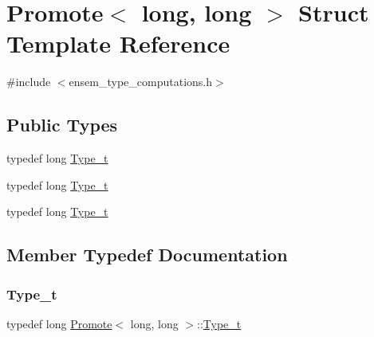 \hypertarget{structPromote_3_01long_00_01long_01_4}{}\section{Promote$<$ long, long $>$ Struct Template Reference}
\label{structPromote_3_01long_00_01long_01_4}


{\ttfamily \#include $<$ensem\+\_\+type\+\_\+computations.\+h$>$}

\subsection*{Public Types}
\begin{DoxyCompactItemize}
\item 
typedef long \mbox{\hyperlink{structPromote_3_01long_00_01long_01_4_a5f00bb17e1f226cbed5e9b1ab9e96081}{Type\+\_\+t}}
\item 
typedef long \mbox{\hyperlink{structPromote_3_01long_00_01long_01_4_a5f00bb17e1f226cbed5e9b1ab9e96081}{Type\+\_\+t}}
\item 
typedef long \mbox{\hyperlink{structPromote_3_01long_00_01long_01_4_a5f00bb17e1f226cbed5e9b1ab9e96081}{Type\+\_\+t}}
\end{DoxyCompactItemize}


\subsection{Member Typedef Documentation}
\mbox{\label{structPromote_3_01long_00_01long_01_4_a5f00bb17e1f226cbed5e9b1ab9e96081}} 
\subsubsection{\texorpdfstring{Type\_t}{Type\_t}\hspace{0.1cm}{\footnotesize\ttfamily [1/3]}}
{\footnotesize\ttfamily typedef long \mbox{\hyperlink{structPromote}{Promote}}$<$ long, long $>$\+::\mbox{\hyperlink{structPromote_3_01long_00_01long_01_4_a5f00bb17e1f226cbed5e9b1ab9e96081}{Type\+\_\+t}}}

\mbox{\label{structPromote_3_01long_00_01long_01_4_a5f00bb17e1f226cbed5e9b1ab9e96081}} 
